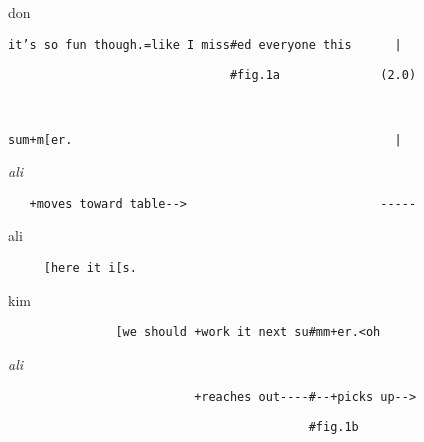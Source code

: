 \documentclass[output=paper,nonflat,modfont,draft]{langsci/langscibook}
\begin{document}
\begin{transbox}{7}{don}
\begin{verbatim}
it’s so fun though.=like I miss#ed everyone this      |
\end{verbatim}
\end{transbox}

\begin{transbox}{8}{\fig}
\begin{verbatim}
                               #fig.1a              (2.0)
\end{verbatim}
\end{transbox}

\begin{transbox}{9}{~}
\begin{verbatim}
sum+m[er.                                             |
\end{verbatim}
\end{transbox}

\begin{transbox}{10}{\textit{ali}}
\begin{verbatim}
   +moves toward table-->                           -----
\end{verbatim}
\end{transbox}

\begin{transbox}{11}{ali}
\begin{verbatim}
     [here it i[s.
\end{verbatim}
\end{transbox}

\begin{transbox}{12}{kim}
\begin{verbatim}
               [we should +work it next su#mm+er.<oh
\end{verbatim}
\end{transbox}

\begin{transbox}{13}{\textit{ali}}
\begin{verbatim}
                          +reaches out----#--+picks up-->
\end{verbatim}
\end{transbox}

\begin{transbox}{14}{\fig}
\begin{verbatim}
                                          #fig.1b
\end{verbatim}
\end{transbox}
\end{document}
